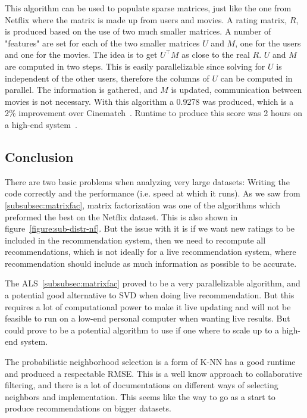 This algorithm can be used to populate sparse matrices, just like the one from Netflix where the matrix is made up from users and movies. A rating matrix, $R$, is produced based on the use of two much smaller matrices. A number of "features" are set for each of the two smaller matrices $U$ and $M$, one for the users and one for the movies. The idea is to get $U^\top M$ as close to the real $R$. $U$ and $M$ are computed in two steps. This is easily parallelizable since solving for $U$ is independent of the other users, therefore the columns of $U$ can be computed in parallel. The information is gathered, and $M$ is updated, communication between movies is not necessary\cite{myrrix}. With this algorithm a 0.9278 was produced, which is a 2\% improvement over Cinematch~\cite{predusingmatrix}. Runtime to produce this score was 2 hours on a high-end system~\cite{alsMPI}.


\subsection{Conclusion}
There are two basic problems when analyzing very large datasets: Writing the code correctly and the performance (i.e. speed at which it runs). As we saw from \ref{subsubsec:matrixfac}, matrix factorization was one of the algorithms which preformed the best on the Netflix dataset. This is also shown in figure~\ref{figure:sub-distr-nf}. But the issue with it is if we want new ratings to be included in the recommendation system, then we need to recompute all recommendations, which is not ideally for a live recommendation system, where recommendation should include as much information as possible to be accurate.

The ALS~\ref{subsubsec:matrixfac} proved to be a very parallelizable algorithm, and a potential good alternative to SVD when doing live recommendation. But this requires a lot of computational power to make it live updating and will not be feasible to run on a low-end personal computer when wanting live results. But could prove to be a potential algorithm to use if one where to scale up to a high-end system.

The probabilistic neighborhood selection is a form of K-NN has a good runtime and produced a respectable RMSE. This is a well know approach to collaborative filtering, and there is a lot of documentations on different ways of selecting neighbors and implementation. This seems like the way to go as a start to produce recommendations on bigger datasets.



